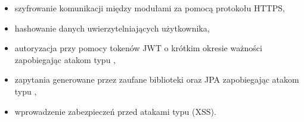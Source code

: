\begin{itemize}
    \item szyfrowanie komunikacji między modułami za pomocą protokołu HTTPS,
    \item hashowanie danych uwierzytelniających użytkownika,
    \item autoryzacja przy pomocy tokenów JWT o krótkim okresie ważności zapobiegając atakom typu ,
    \item zapytania generowane przez zaufane biblioteki oraz JPA zapobiegając atakom typu ,
    \item wprowadzenie zabezpieczeń przed atakami typu  (XSS).
\end{itemize}